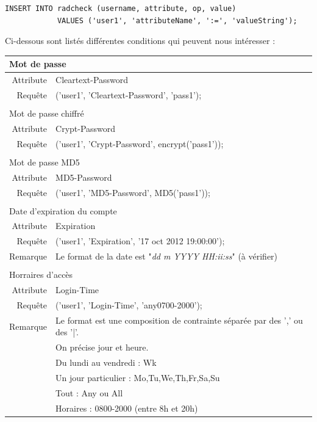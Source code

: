 \begin{verbatim}
INSERT INTO radcheck (username, attribute, op, value)
            VALUES ('user1', 'attributeName', ':=', 'valueString');
\end{verbatim}

Ci-dessous sont listés différentes conditions qui peuvent nous intéresser :

\begin{tabular}{rl}
  \multicolumn{2}{l}{Mot de passe} \\
  \hline
  Attribute & Cleartext-Password \\
  Requête & ('user1', 'Cleartext-Password', 'pass1'); \\
  \\
  \multicolumn{2}{l}{Mot de passe chiffré} \\
  \hline
  Attribute & Crypt-Password \\
  Requête & ('user1', 'Crypt-Password', encrypt('pass1')); \\
  \\
  \multicolumn{2}{l}{Mot de passe MD5} \\
  \hline
  Attribute & MD5-Password \\
  Requête & ('user1', 'MD5-Password', MD5('pass1')); \\
  \\
	\multicolumn{2}{l}{Date d'expiration du compte} \\
  \hline
  Attribute & Expiration \\
  Requête & ('user1', 'Expiration', '17 oct 2012 19:00:00'); \\
	Remarque & Le format de la date est "\textit{dd m YYYY HH:ii:ss}" (à vérifier) \\
	\\
	\multicolumn{2}{l}{Horraires d'accès} \\
  \hline
  Attribute & Login-Time \\
  Requête & ('user1', 'Login-Time', 'any0700-2000'); \\
	Remarque & Le format est une composition de contrainte séparée par des ',' ou des '|'. \\
					 & On précise jour et heure. \\
					 & Du lundi au vendredi : Wk \\
					 & Un jour particulier : Mo,Tu,We,Th,Fr,Sa,Su \\
					 & Tout : Any ou All \\
					 & Horaires : 0800-2000 (entre 8h et 20h) \\

\end{tabular}
